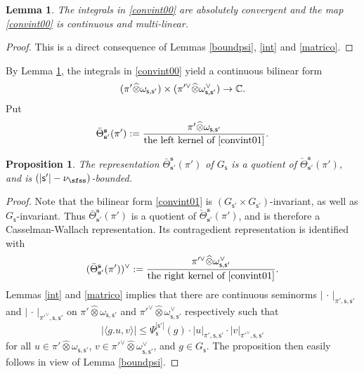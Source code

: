 \documentclass[12pt,a4paper]{amsart}
\def\abs#1{\left|{#1}\right|}
\newcommand{\la}{\langle}
\newcommand{\ra}{\rangle}
\newcommand{\be}{\begin {equation}}
\newcommand{\ee}{\end {equation}}
\numberwithin{equation}{section}
\newtheorem{lem}[thm]{Lemma}
\newtheorem{prop}[thm]{Proposition}
\theoremstyle{remark}
\def\Thetab{\bar{\Theta}}
\begin{document}
\begin{lem}\label{lemconv}
The integrals in \eqref{convint00} are absolutely convergent and the map \eqref{convint00} is   continuous and multi-linear.
\end{lem}
\begin{proof}
This is a direct consequence of Lemmas \ref{boundpsi}, \ref{int} and \ref{matrico}.
\end{proof}

By Lemma \ref{lemconv}, the integrals in \eqref{convint00} yield a continuous bilinear form
\be\label{convint01}
 (\pi' \widehat \otimes \omega_{\mathsf s, \mathsf s'})\times (\pi'^\vee \widehat \otimes \omega_{\mathsf s, \mathsf s'}^\vee )\rightarrow \C.
 \ee
Put
\begin{equation}\label{thetab0}
  \Thetab_{\mathbf s'}^{\mathbf s}(\pi'):=\frac{\pi' \widehat \otimes \omega_{\mathsf s, \mathsf s'}}{\textrm{the left kernel of \eqref{convint01}}}.
\end{equation}

\begin{prop}\label{boundm}
The representation $\Thetab_{\mathbf s'}^{\mathbf s}(\pi')$ of $G_{\mathsf s}$ is a quotient of  $\check \Theta_{\mathbf s'}^{\mathbf s}(\pi')$, and is  $(\abs{\mathsf s'}-\nu_\sfss)$-bounded.
\end{prop}
\begin{proof}
Note that the bilinear form \eqref{convint01} is  $(G_{\mathsf s'}\times G_{\mathsf s'})$-invariant, as well as $G_{\mathsf s}$-invariant. Thus $\Thetab_{\mathbf s'}^{\mathbf s}(\pi')$ is a quotient of  $\check \Theta_{\mathbf s'}^{\mathbf s}(\pi')$, and is therefore a Casselman-Wallach representation. Its contragedient representation
is identified with
\[
(\Thetab_{\mathbf s'}^{\mathbf s}(\pi'))^\vee:=\frac{\pi'^\vee \widehat \otimes \omega^\vee_{\mathsf s, \mathsf s'}}{\textrm{the right kernel of \eqref{convint01}}}.
\]
 Lemmas \ref{int} and \ref{matrico} implies that there are continuous seminorms $\abs{\,\cdot\,}_{\pi', \mathsf s, \mathsf s'}$ and $\abs{\,\cdot\,}_{\pi'^\vee, \mathsf s, \mathsf s'}$ on  $\pi' \widehat \otimes \omega_{\mathsf s, \mathsf s'}$ and $\pi'^\vee \widehat \otimes \omega^\vee_{\mathsf s, \mathsf s'}$ respectively such that
\[
 \abs{ \la g. u, v\ra}\leq \Psi_{\mathsf s}^{\abs{\mathsf s'}}(g)\cdot \abs{u}_{\pi', \mathsf s, \mathsf s'}\cdot \abs{v}_{\pi'^\vee, \mathsf s, \mathsf s'}
\]
for all $u\in \pi' \widehat \otimes \omega_{\mathsf s, \mathsf s'}$, $v\in \pi'^\vee \widehat \otimes \omega^\vee_{\mathsf s, \mathsf s'}$, and $g\in G_{\mathsf s}$.
The proposition  then easily follows in view of  Lemma \ref{boundpsi}.
 \end{proof}
\end{document}
